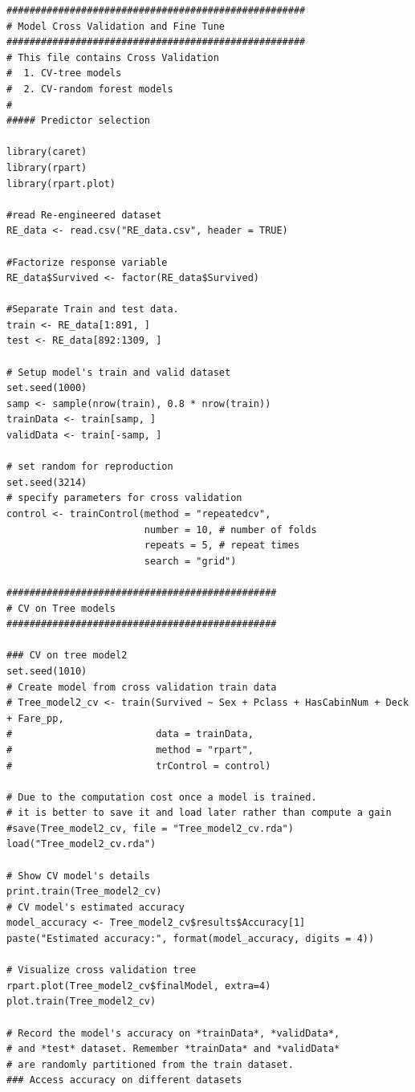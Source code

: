\documentclass[
]{book}
\begin{document}
\begin{verbatim}
####################################################
# Model Cross Validation and Fine Tune
####################################################
# This file contains Cross Validation
#  1. CV-tree models
#  2. CV-random forest models
#
##### Predictor selection

library(caret)
library(rpart)
library(rpart.plot)

#read Re-engineered dataset
RE_data <- read.csv("RE_data.csv", header = TRUE)

#Factorize response variable
RE_data$Survived <- factor(RE_data$Survived)

#Separate Train and test data.
train <- RE_data[1:891, ]
test <- RE_data[892:1309, ]

# Setup model's train and valid dataset
set.seed(1000)
samp <- sample(nrow(train), 0.8 * nrow(train))
trainData <- train[samp, ]
validData <- train[-samp, ]

# set random for reproduction
set.seed(3214)
# specify parameters for cross validation
control <- trainControl(method = "repeatedcv",
                        number = 10, # number of folds
                        repeats = 5, # repeat times
                        search = "grid")

###############################################
# CV on Tree models
###############################################

### CV on tree model2
set.seed(1010)
# Create model from cross validation train data
# Tree_model2_cv <- train(Survived ~ Sex + Pclass + HasCabinNum + Deck + Fare_pp,
#                         data = trainData,
#                         method = "rpart",
#                         trControl = control)

# Due to the computation cost once a model is trained.
# it is better to save it and load later rather than compute a gain
#save(Tree_model2_cv, file = "Tree_model2_cv.rda")
load("Tree_model2_cv.rda")

# Show CV model's details
print.train(Tree_model2_cv)
# CV model's estimated accuracy
model_accuracy <- Tree_model2_cv$results$Accuracy[1]
paste("Estimated accuracy:", format(model_accuracy, digits = 4))

# Visualize cross validation tree
rpart.plot(Tree_model2_cv$finalModel, extra=4)
plot.train(Tree_model2_cv)

# Record the model's accuracy on *trainData*, *validData*,
# and *test* dataset. Remember *trainData* and *validData*
# are randomly partitioned from the train dataset.
### Access accuracy on different datasets


\end{verbatim}
\end{document}
